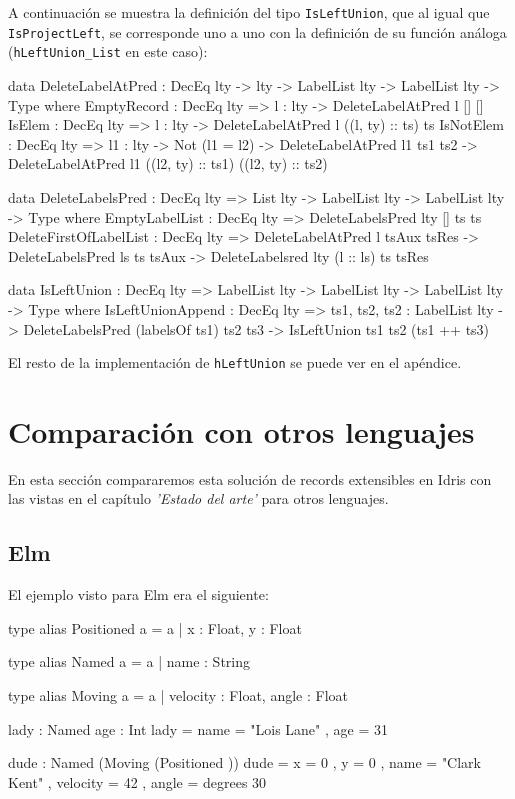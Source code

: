 A continuación se muestra la definición del tipo \texttt{IsLeftUnion}, que al igual que \texttt{IsProjectLeft}, se corresponde uno a uno con la definición de su función análoga (\texttt{hLeftUnion\_List} en este caso):

\begin{code}
data DeleteLabelAtPred : DecEq lty -> lty -> LabelList lty ->
  LabelList lty -> Type where
  EmptyRecord : DecEq lty => {l : lty} ->
    DeleteLabelAtPred l [] []
  IsElem : DecEq lty => {l : lty} ->
    DeleteLabelAtPred l ((l, ty) :: ts) ts
  IsNotElem : DecEq lty => {l1 : lty} -> Not (l1 = l2) ->
    DeleteLabelAtPred l1 ts1 ts2 ->
    DeleteLabelAtPred l1 ((l2, ty) :: ts1) ((l2, ty) :: ts2)

data DeleteLabelsPred : DecEq lty => List lty -> LabelList lty ->
  LabelList lty -> Type where
  EmptyLabelList : DecEq lty =>
    DeleteLabelsPred {lty} [] ts ts
  DeleteFirstOfLabelList : DecEq lty =>
    DeleteLabelAtPred l tsAux tsRes ->
    DeleteLabelsPred ls ts tsAux ->
    DeleteLabelsred {lty} (l :: ls) ts tsRes

data IsLeftUnion : DecEq lty => LabelList lty -> LabelList lty ->
  LabelList lty -> Type where
  IsLeftUnionAppend : DecEq lty =>
    {ts1, ts2, ts2 : LabelList lty} ->
    DeleteLabelsPred (labelsOf ts1) ts2 ts3 ->
    IsLeftUnion ts1 ts2 (ts1 ++ ts3)
\end{code}

El resto de la implementación de \texttt{hLeftUnion} se puede ver en el apéndice.

\section{Comparación con otros lenguajes}

En esta sección compararemos esta solución de records extensibles en Idris con las vistas en el capítulo \textit{'Estado del arte'} para otros lenguajes.

\subsection{Elm}

El ejemplo visto para Elm era el siguiente:

\begin{code}
type alias Positioned a =
  { a | x : Float, y : Float }

type alias Named a =
  { a | name : String }

type alias Moving a =
  { a | velocity : Float, angle : Float }

lady : Named { age : Int }
lady =
  { name = "Lois Lane"
  , age = 31
  }

dude : Named (Moving (Positioned {}))
dude =
  { x = 0
  , y = 0
  , name = "Clark Kent"
  , velocity = 42
  , angle = degrees 30
  }
\end{code}

